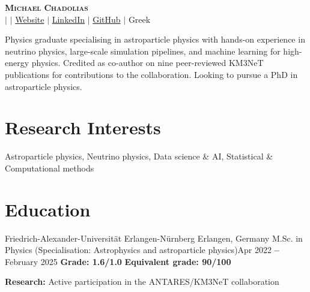 \documentclass[letterpaper,11pt]{article}
\begin{document}

\begin{center}
    \textbf{\Huge \scshape Michael Chadolias} \\ \vspace{3pt}
    \small
    \faMobile \hspace{.5pt} \href{tel:\mobile}{\mobile}
    $|$
    \faAt \hspace{.5pt} \href{mailto:\email}{\email}
    $|$
    \faGlobe \hspace{.5pt} \href{\website}{Website}
    $|$
    \faLinkedinSquare \hspace{.5pt} \href{\linkedin}{LinkedIn}
    $|$
    \faGithub \hspace{.5pt} \href{\gitprofile}{GitHub}
    $|$
    \faMap \hspace{.5pt} Greek
\end{center}

Physics graduate specialising in astroparticle physics with hands-on experience in neutrino physics, large-scale simulation pipelines, and machine learning for high-energy physics. Credited as co-author on nine peer-reviewed KM3NeT publications for contributions to the collaboration. Looking to pursue a PhD in astroparticle physics.
\vspace{1.5pt}


\section{Research Interests}
  \vspace{2pt}
  \resumeSubHeadingListStart
    \small{\item{
        {Astroparticle physics, Neutrino physics, Data science \& AI, Statistical \& Computational methods} 
    }}
  \resumeSubHeadingListEnd

\section{Education}
  \vspace{3pt}
  \resumeSubHeadingListStart
    
    \resumeEducationHeading
      {Friedrich-Alexander-Universität Erlangen-Nürnberg
      }{Erlangen, Germany}
      {M.Sc. in Physics (Specialisation: Astrophysics and astroparticle physics)}{Apr 2022 \textbf{--} February 2025}
      {\textbf{Grade: 1.6/1.0} \quad \textbf{Equivalent grade: 90/100}}{}
        \resumeSubHeadingListStart
        \small{\item{
             \textbf{Research:} Active participation in the ANTARES/KM3NeT collaboration}}
        \resumeSubHeadingListEnd
\end{document}
